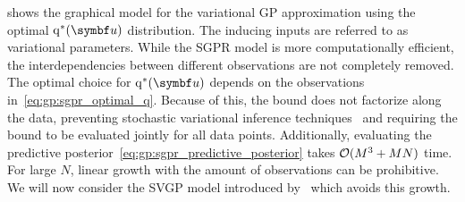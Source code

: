  shows the graphical model for the variational GP approximation using the optimal $\q^\ast(\mat{u})$ distribution.
The inducing inputs
are referred to as variational parameters.
While the SGPR model is more computationally efficient, the interdependencies between different observations are not completely removed.
The optimal choice for $\q^\ast(\mat{u})$ depends on the observations in~\cref{eq:gp:sgpr_optimal_q}.
Because of this, the bound does not factorize along the data, preventing stochastic variational inference techniques~\parencite{hensman_gaussian_2013} and requiring the bound to be evaluated jointly for all data points.
Additionally, evaluating the predictive posterior~\cref{eq:gp:sgpr_predictive_posterior} takes $\operatorname{\mathcal{O}}(M^3 + MN)$ time.
For large $N$, linear growth with the amount of observations can be prohibitive.
We will now consider the SVGP model introduced by~\textcite{hensman_gaussian_2013} which avoids this growth.

